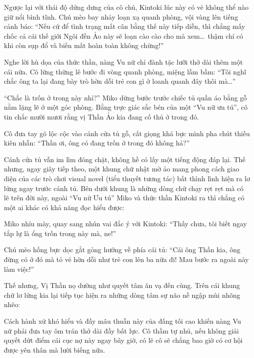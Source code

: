 \documentclass[../main.tex]{subfiles}
\begin{document}
Ngược lại với thái độ dửng dưng của cô chủ, Kintoki lúc này có vẻ không thể nào giữ nổi bình tĩnh. Chú mèo bay nhảy loạn xạ quanh phòng, vội vàng lên tiếng cảnh báo: ``Nếu cứ để tình trạng mất cân bằng thế này tiếp diễn, thì chẳng mấy chốc cả cái thế giới Ngôi đền Ảo này sẽ loạn cào cào cho mà xem\dots\ thậm chí có khi còn sụp đổ và biến mất hoàn toàn không chừng!''

Nghe lời hù dọa của thức thần, nàng Vu nữ chỉ đành tặc lưỡi thở dài thêm một cái nữa. Cô lững thững lê bước đi vòng quanh phòng, miệng lầm bầm: ``Tôi nghĩ chắc ông ta lại đang bày trò hờn dỗi trẻ con gì ở loanh quanh đây thôi mà\dots''

``Chắc là trốn ở trong này nhỉ?'' Miko dừng bước trước chiếc tủ quần áo bằng gỗ nằm lặng lẽ ở một góc phòng. Bằng trực giác sắc bén của một ``Vu nữ ưu tú'', cô tin chắc mười mươi rằng vị Thần Ảo kia đang cố thủ ở trong đó.


Cô đưa tay gõ lộc cộc vào cánh cửa tủ gỗ, cất giọng khá bực mình pha chút thiếu kiên nhẫn: ``Thần ơi, ông có đang trốn ở trong đó không hả?''

Cánh cửa tủ vẫn im lìm đóng chặt, không hề có lấy một tiếng động đáp lại. Thế nhưng, ngay giây tiếp theo, một khung chữ nhật mờ ảo mang phong cách giao diện của các trò chơi visual novel (tiểu thuyết tương tác) bất thình lình hiện ra lơ lửng ngay trước cánh tủ. Bên dưới khung là những dòng chữ chạy rẹt rẹt mà có lẽ trên đời này, ngoài ``Vu nữ Ưu tú'' Miko và thức thần Kintoki ra thì chẳng có một ai khác có khả năng đọc hiểu được:


Miko nhíu mày, quay sang nhún vai đắc ý với Kintoki: ``Thấy chưa, tôi biết ngay tắp lự là ổng trốn trong này mà, ne!''

Chú mèo hồng bực dọc gắt gỏng hướng về phía cái tủ: ``Cái ông Thần kia, ông đừng có ở đó mà tỏ vẻ hờn dỗi như trẻ con lên ba nữa đi! Mau bước ra ngoài này làm việc!''

Thế nhưng, Vị Thần nọ dường như quyết tâm ăn vạ đến cùng. Trên cái khung chữ lơ lửng kia lại tiếp tục hiện ra những dòng tâm sự não nề ngập mùi nhõng nhẽo:


Cách hành xử khó hiểu và đầy mâu thuẫn này của đấng tối cao khiến nàng Vu nữ phải đưa tay ôm trán thở dài đầy bất lực. Cô thầm tự nhủ, nếu không giải quyết dứt điểm cái cục nợ này ngay bây giờ, có lẽ cô sẽ chẳng bao giờ có cơ hội được yên thân mà lười biếng nữa.
\end{document}
